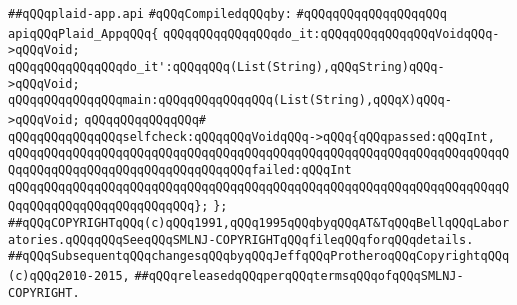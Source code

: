 \label{src/lib/x-kit/tut/plaid/plaid-app.api}
\verb|##qQQqplaid-app.api|\newline
\newline
\verb|#qQQqCompiledqQQqby:|\newline
\verb|#qQQqqQQqqQQqqQQqqQQq|\newline
\newline
\verb|apiqQQqPlaid_AppqQQq{|\newline
\verb|qQQqqQQqqQQqqQQqdo_it:qQQqqQQqqQQqqQQqVoidqQQq->qQQqVoid;|\newline
\verb|qQQqqQQqqQQqqQQqdo_it':qQQqqQQq(List(String),qQQqString)qQQq->qQQqVoid;|\newline
\verb|qQQqqQQqqQQqqQQqmain:qQQqqQQqqQQqqQQq(List(String),qQQqX)qQQq->qQQqVoid;|\newline
\verb|qQQqqQQqqQQqqQQq#|\newline
\verb|qQQqqQQqqQQqqQQqselfcheck:qQQqqQQqVoidqQQq->qQQq{qQQqpassed:qQQqInt,|\newline
\verb|qQQqqQQqqQQqqQQqqQQqqQQqqQQqqQQqqQQqqQQqqQQqqQQqqQQqqQQqqQQqqQQqqQQqqQQqqQQqqQQqqQQqqQQqqQQqqQQqqQQqqQQqfailed:qQQqInt|\newline
\verb|qQQqqQQqqQQqqQQqqQQqqQQqqQQqqQQqqQQqqQQqqQQqqQQqqQQqqQQqqQQqqQQqqQQqqQQqqQQqqQQqqQQqqQQqqQQqqQQq};|\newline
\verb|};|\newline
\newline
\verb|##qQQqCOPYRIGHTqQQq(c)qQQq1991,qQQq1995qQQqbyqQQqAT&TqQQqBellqQQqLaboratories.qQQqqQQqSeeqQQqSMLNJ-COPYRIGHTqQQqfileqQQqforqQQqdetails.|\newline
\verb|##qQQqSubsequentqQQqchangesqQQqbyqQQqJeffqQQqProtheroqQQqCopyrightqQQq(c)qQQq2010-2015,|\newline
\verb|##qQQqreleasedqQQqperqQQqtermsqQQqofqQQqSMLNJ-COPYRIGHT.|\newline

